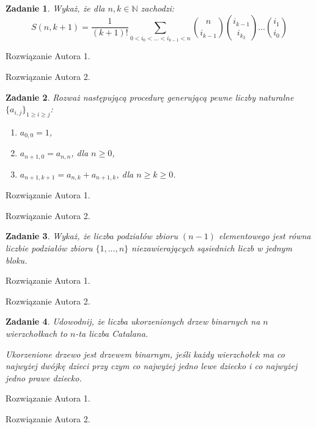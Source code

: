 \documentclass{mwart}
\newtheorem{zad}{Zadanie}[section]
\begin{document}
\begin{zad}
    Wykaż, że dla $n, k \in \mathbb{N}$ zachodzi:
    \[S(n,k+1)=\frac{1}{(k+1)!} \sum_{0<i_0<...<i_{k-1}<n} \binom{n}{i_{k-1}}\binom{i_{k-1}}{i_{k_2}}...\binom{i_1}{i_0}     \]
\end{zad}
\begin{mdframed}
    Rozwiązanie Autora 1.
\end{mdframed}
\begin{mdframed}
    Rozwiązanie Autora 2.
\end{mdframed}





\begin{zad}
    Rozważ  następującą procedurę generującą pewne liczby naturalne
    $\{a_{i,j}\}_{1 \geq i \geq j}$:
    \begin{enumerate}
        \item $a_{0,0} = 1$,
        \item $a_{n+1, 0} = a_{n,n}$, dla $n \geq 0$,
        \item $a_{n+1, k+1} = a_{n, k} + a_{n+1, k}$, dla $n \geq k \geq 0$.
    \end{enumerate}
\end{zad}
\begin{mdframed}
    Rozwiązanie Autora 1.
\end{mdframed}
\begin{mdframed}
    Rozwiązanie Autora 2.
\end{mdframed}




\begin{zad}
    Wykaż, że liczba podziałów zbioru $(n - 1)$  elementowego jest równa
    liczbie podziałów zbioru $\{1, ..., n\}$ niezawierających sąsiednich liczb w jednym bloku.
\end{zad}
\begin{mdframed}
    Rozwiązanie Autora 1.
\end{mdframed}
\begin{mdframed}
    Rozwiązanie Autora 2.
\end{mdframed}




\begin{zad}
    Udowodnij, że liczba ukorzenionych drzew binarnych na $n$ wierzchołkach to $n$-ta liczba Catalana.

    Ukorzenione drzewo jest drzewem binarnym, jeśli każdy wierzchołek ma co najwyżej
    dwójkę dzieci przy czym co najwyżej jedno lewe dziecko i co najwyżej jedno prawe dziecko.
\end{zad}
\begin{mdframed}
    Rozwiązanie Autora 1.
\end{mdframed}
\begin{mdframed}
    Rozwiązanie Autora 2.
\end{mdframed}
\end{document}
